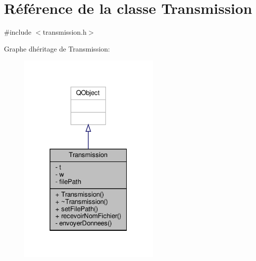 \hypertarget{classTransmission}{}\section{Référence de la classe Transmission}
\label{classTransmission}


{\ttfamily \#include $<$transmission.\+h$>$}



Graphe d\textquotesingle{}héritage de Transmission\+:\nopagebreak
\begin{figure}[H]
\begin{center}
\leavevmode
\includegraphics[width=196pt]{classTransmission__inherit__graph}
\end{center}
\end{figure}


